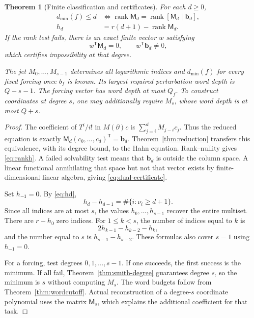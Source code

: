 \documentclass[11pt,a4paper]{article}
\numberwithin{equation}{section}
\newtheorem{theorem}{Theorem}[section]
\theoremstyle{definition}
\theoremstyle{remark}
\theoremstyle{definition}
\newcommand{\rank}{\operatorname{rank}}
\newcommand{\Tmat}{\mathsf M}
\begin{document}
\begin{theorem}[Finite classification and certificates]
\label{thm:toeplitz}
For each $d\ge0$,
\begin{align}
 d_{\min}(f)\le d
 &\Longleftrightarrow
 \rank\Tmat_d=\rank[\Tmat_d\mid\mathbf b_d],\label{eq:ranktest}\\
 h_d&=r(d+1)-\rank\Tmat_d.
 \label{eq:rankh}
\end{align}
If the rank test fails, there is an exact finite vector $w$ satisfying
\begin{equation}
 w^{\mathsf T}\Tmat_d=0,
 \qquad w^{\mathsf T}\mathbf b_d\ne0,
 \label{eq:dual-certificate}
\end{equation}
which certifies impossibility at that degree.

The jet $M_0,\ldots,M_{s-1}$ determines all logarithmic indices and $d_{\min}(f)$ for every fixed forcing once $b_f$ is known. Its largest required perturbation-word depth is $Q+s-1$. The forcing vector has word depth at most $Q_f$. To construct coordinates at degree $s$, one may additionally require $M_s$, whose word depth is at most $Q+s$.
\end{theorem}
\begin{proof}
The coefficient of $T^i/i!$ in $M(\partial)c$ is $\sum_{j=i}^{d}M_{j-i}c_j$. Thus the reduced equation is exactly $\Tmat_d(c_0,\ldots,c_d)^{\mathsf T}=\mathbf b_d$. Theorem~\ref{thm:reduction} transfers this equivalence, with its degree bound, to the Hahn equation. Rank--nullity gives \eqref{eq:rankh}. A failed solvability test means that $\mathbf b_d$ is outside the column space. A linear functional annihilating that space but not that vector exists by finite-dimensional linear algebra, giving \eqref{eq:dual-certificate}.

Set $h_{-1}=0$. By \eqref{eq:hd},
\begin{equation}
 h_d-h_{d-1}=\#\{i:\nu_i\ge d+1\}.
 \label{eq:index-differences}
\end{equation}
Since all indices are at most $s$, the values $h_0,\ldots,h_{s-1}$ recover the entire multiset. There are $r-h_0$ zero indices. For $1\le k<s$, the number of indices equal to $k$ is
\begin{equation}
 2h_{k-1}-h_{k-2}-h_k,
 \label{eq:multiplicity}
\end{equation}
and the number equal to $s$ is $h_{s-1}-h_{s-2}$. These formulas also cover $s=1$ using $h_{-1}=0$.

For a forcing, test degrees $0,1,\ldots,s-1$. If one succeeds, the first success is the minimum. If all fail, Theorem~\ref{thm:smith-degree} guarantees degree $s$, so the minimum is $s$ without computing $M_s$. The word budgets follow from Theorem~\ref{thm:wordcutoff}. Actual reconstruction of a degree-$s$ coordinate polynomial uses the matrix $\Tmat_s$, which explains the additional coefficient for that task.
\end{proof}
\end{document}
